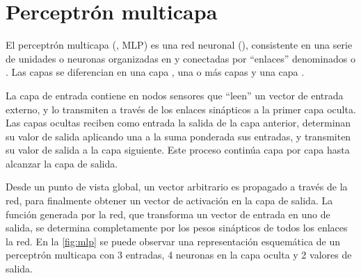 \section{Perceptrón multicapa}

El perceptrón multicapa (, MLP)
\cite{mlp1,mlp2} es una red neuronal \feedforward{}
(), consistente en una serie de {unidades} o
neuronas organizadas en  y conectadas por ``enlaces''
denominados o .  Las capas se diferencian en
una capa , una o más capas  y una capa
.

La capa de entrada contiene en nodos sensores que ``leen'' un vector
de entrada externo, y lo transmiten a través de los enlaces sinápticos
a la primer capa oculta. Las capas ocultas reciben como entrada la
salida de la capa anterior, determinan su valor de salida aplicando
una  a la suma ponderada sus entradas, y
transmiten su valor de salida a la capa siguiente. Este proceso
continúa capa por capa hasta alcanzar la capa de salida.

Desde un punto de vista global, un vector arbitrario es propagado
 a través de la red, para finalmente obtener un
vector de activación en la capa de salida.  La función generada por la
red, que transforma un vector de entrada en uno de salida, se
determina completamente por los pesos sinápticos de todos los enlaces
la red.  En la \autoref{fig:mlp} se puede observar una representación
esquemática de un perceptrón multicapa con 3 entradas, 4 neuronas en
la capa oculta y 2 valores de salida.